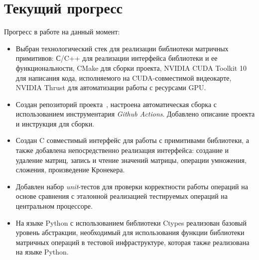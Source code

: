 \section{Текущий прогресс}

Прогресс в работе на данный момент:

\begin{itemize}
    \item Выбран технологический стек для реализации библиотеки матричных примитивов: С/C++ для реализации интерфейса библиотеки и ее функциональности, CMake для сборки проекта, NVIDIA CUDA Toolkit 10 для написания кода, исполняемого на CUDA-совместимой видеокарте, NVIDIA Thrust для автоматизации работы с ресурсами GPU.
    \item Создан репозиторий проекта~\cite{net:cubool_project}, настроена автоматическая сборка с использованием инструментария \textit{Github Actions}. Добавлено описание проекта и инструкция для сборки.
    \item Создан C совместимый интерфейс для работы с примитивами библиотеки, а также добавлена непосредственно реализация интерфейса: создание и удаление матриц, запись и чтение значений матрицы, операции умножения, сложения, произведение Кронекера.
    \item Добавлен набор \textit{unit}-тестов для проверки корректности работы операций на основе сравнения с эталонной реализацией тестируемых операций на центральном процессоре.
    \item На языке Python с использованием библиотеки Ctypes реализован базовый уровень абстракции, необходимый для использования функции библиотеки матричных операций в тестовой инфраструктуре, которая также реализована на языке Python.
\end{itemize}